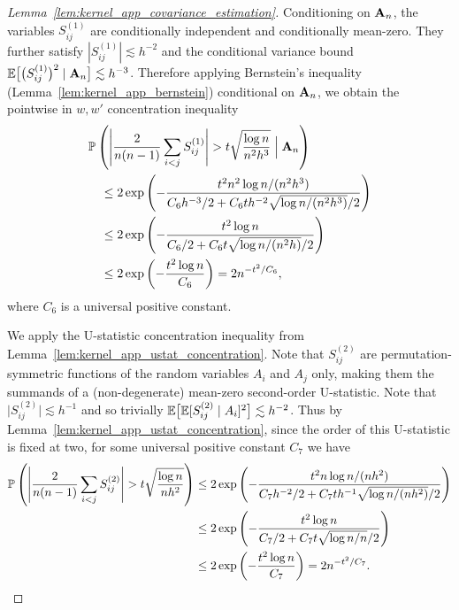 \begin{proof}[Lemma~\ref{lem:kernel_app_covariance_estimation}]
  Conditioning on $\bA_n$,
  the variables $S_{i j}^{(1)}$
  are conditionally independent
  and conditionally mean-zero.
  They further satisfy
  $|S_{i j}^{(1)}| \lesssim h^{-2}$
  and the conditional variance bound
  $\E\big[\big( S_{i j}^{(1)} \big)^2 \mid \bA_n \big] \lesssim h^{-3}$.
  Therefore applying Bernstein's inequality
  (Lemma~\ref{lem:kernel_app_bernstein})
  conditional on $\bA_n$,
  we obtain the pointwise in $w,w'$
  concentration inequality
  \begin{align*}
    &\P\left(
      \Bigg|
      \frac{2}{n(n-1)}
      \sum_{i<j}
      S_{i j}^{(1)}
      \Bigg|
      > t
      \sqrt{\frac{\log n}{n^2h^3}}
      \Bigm\vert \bA_n
    \right) \\
    &\quad\leq
    2 \exp\left(
      - \frac{t^2 n^2 \log n / (n^2h^3)}
      {C_6 h^{-3} / 2 + C_6 t h^{-2} \sqrt{\log n / (n^2h^3)} / 2}
    \right) \\
    &\quad\leq
    2 \exp\left(
      - \frac{t^2 \log n}
      {C_6 / 2 + C_6 t \sqrt{\log n / (n^2h)} / 2}
    \right) \\
    &\quad\leq
    2 \exp\left(
      - \frac{t^2 \log n}{C_6}
    \right)
    =
    2 n^{-t^2 / C_6},
  \end{align*}
  where $C_6$ is a universal positive constant.


  We apply the U-statistic concentration inequality from
  Lemma~\ref{lem:kernel_app_ustat_concentration}.
  Note that $S_{i j}^{(2)}$
  are permutation-symmetric functions of
  the random variables
  $A_i$ and $A_j$ only,
  making them the summands of
  a (non-degenerate) mean-zero second-order U-statistic.
  Note that
  $\big|S_{i j}^{(2)}\big| \lesssim h^{-1}$
  and so trivially
  $\E\big[\E[S_{i j}^{(2)} \mid A_i ]^2 \big] \lesssim h^{-2}$.
  Thus by Lemma~\ref{lem:kernel_app_ustat_concentration},
  since the order of this U-statistic is fixed at two,
  for some universal positive constant $C_7$ we have
  \begin{align*}
    \P\left(
      \Bigg|
      \frac{2}{n(n-1)}
      \sum_{i<j}
      S_{i j}^{(2)}
      \Bigg|
      > t
      \sqrt{\frac{\log n}{n h^2}}
    \right)
    &\leq
    2 \exp\left(
      - \frac{t^2 n \log n / (n h^2)}
      {C_7 h^{-2} / 2 + C_7 t h^{-1} \sqrt{\log n / (n h^2)} / 2}
    \right) \\
    &\leq
    2 \exp\left(
      - \frac{t^2 \log n}
      {C_7 / 2 + C_7 t \sqrt{\log n / n} / 2}
    \right) \\
    &\leq
    2 \exp\left(
      - \frac{t^2 \log n}{C_7}
    \right)
    =
    2 n^{-t^2 / C_7}.
  \end{align*}


\end{proof}
